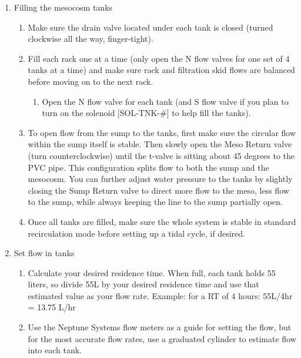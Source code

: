 \documentclass[]{book}
\providecommand{\tightlist}{%
  \setlength{\itemsep}{0pt}\setlength{\parskip}{0pt}}
\begin{document}
\begin{enumerate}
\def\labelenumi{\arabic{enumi}.}
\tightlist
\item
  Filling the mesocosm tanks

  \begin{enumerate}
  \def\labelenumii{\arabic{enumii}.}
  \tightlist
  \item
    Make sure the drain valve located under each tank is closed (turned
    clockwise all the way, finger-tight).
  \item
    Fill each rack one at a time (only open the N flow valves for one
    set of 4 tanks at a time) and make sure rack and filtration skid
    flows are balanced before moving on to the next rack.

    \begin{enumerate}
    \def\labelenumiii{\arabic{enumiii}.}
    \tightlist
    \item
      Open the N flow valve for each tank (and S flow valve if you plan
      to turn on the solenoid {[}SOL-TNK-\#{]} to help fill the tanks).
    \end{enumerate}
  \item
    To open flow from the sump to the tanks, first make sure the
    circular flow within the sump itself is stable. Then slowly open the
    Meso Return valve (turn counterclockwise) until the t-valve is
    sitting about 45 degrees to the PVC pipe. This configuration splits
    flow to both the sump and the mesocosm. You can further adjust water
    pressure to the tanks by slightly closing the Sump Return valve to
    direct more flow to the meso, less flow to the sump, while always
    keeping the line to the sump partially open.
  \item
    Once all tanks are filled, make sure the whole system is stable in
    standard recirculation mode before setting up a tidal cycle, if
    desired.
  \end{enumerate}
\item
  Set flow in tanks

  \begin{enumerate}
  \def\labelenumii{\arabic{enumii}.}
  \tightlist
  \item
    Calculate your desired residence time. When full, each tank holds 55
    liters, so divide 55L by your desired residence time and use that
    estimated value as your flow rate. Example: for a RT of 4 hours:
    55L/4hr = 13.75 L/hr
  \item
    Use the Neptune Systems flow meters as a guide for setting the flow,
    but for the most accurate flow rates, use a graduated cylinder to
    estimate flow into each tank.


\end{enumerate}
\end{enumerate}
\end{document}
